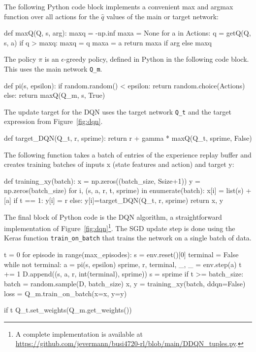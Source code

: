 The following Python code block implements a convenient max and argmax function over all actions for the $\hat{q}$ values of the main or target network:

\begin{pythoncode}
def maxQ(Q, s, arg):
    maxq = -np.inf
    maxa = None
    for a in Actions:
        q = getQ(Q, s, a)
        if q > maxq:
            maxq = q
            maxa = a
    return maxa if arg else maxq
\end{pythoncode}

The policy $\pi$ is an $\epsilon$-greedy policy, defined in Python in the following code block. This uses the main network \texttt{Q\_m}.

\begin{pythoncode}
def pi(s, epsilon):
    if random.random() < epsilon:
        return random.choice(Actions)
    else:
        return maxQ(Q_m, s, True)
\end{pythoncode}

The update target for the DQN uses the target network \texttt{Q\_t} and the target expression from Figure~\ref{fig:dqn}. 

\begin{pythoncode}
def target_DQN(Q_t, r, sprime):
    return r + gamma * maxQ(Q_t, sprime, False)
\end{pythoncode}

The following function takes a batch of entries of the experience replay buffer and creates training batches of inputs x (state features and action) and target y:

\begin{pythoncode}
def training_xy(batch):
    x = np.zeros((batch_size, Ssize+1))
    y = np.zeros(batch_size)
    for i, (s, a, r, t, sprime) in enumerate(batch):
        x[i] = list(s) + [a]
        if t == 1:
            y[i] = r
        else:
            y[i]=target_DQN(Q_t, r, sprime)
    return x, y
\end{pythoncode}

The final block of Python code is the DQN algorithm, a straightforward implementation of Figure~\ref{fig:dqn}\footnote{A complete implementation is available at \url{https://github.com/jevermann/busi4720-rl/blob/main/DDQN_tuples.py}.}. The SGD update step is done using the Keras function \texttt{train\_on\_batch} that trains the network on a single batch of data.

\begin{pythoncode}
t = 0
for episode in range(max_episodes):
    s = env.reset()[0]
    terminal = False
    while not terminal:
        a = pi(s, epsilon)
        sprime, r, terminal, _, _ = env.step(a)
        t += 1
        D.append((s, a, r, int(terminal), sprime))
        s = sprime
        if t >= batch_size:
            batch = random.sample(D, batch_size)
            x, y = training_xy(batch, ddqn=False)
            loss = Q_m.train_on_batch(x=x, y=y)

        if t %
            Q_t.set_weights(Q_m.get_weights())
\end{pythoncode}

